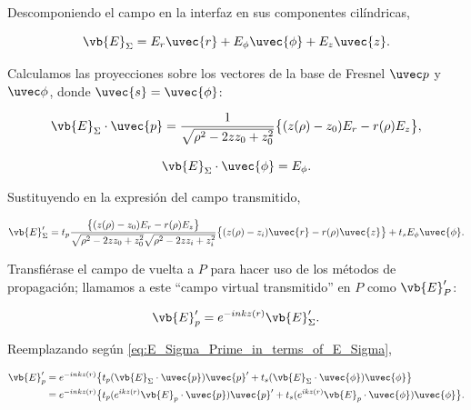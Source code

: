 Descomponiendo el campo en la interfaz en sus componentes cilíndricas,

\begin{equation}
    \vb{E}_{\Sigma}
    =
    E_r \uvec{r}
    +
    E_{\phi} \uvec{\phi}
    +
    E_z \uvec{z}.
\end{equation}

Calculamos las proyecciones sobre los vectores de la base de Fresnel $\uvec p$ y $\uvec \phi$, donde $\uvec{s}=\uvec{\phi}$:

\begin{equation}
    \vb{E}_{\Sigma} \cdot \uvec{p}
    =
    \frac{1}{\sqrt{\rho^2 - 2zz_0 + z_0^2}}
    \big\{
    (z(\rho) - z_0) E_r
    -
    r(\rho) E_z
    \big\},
\end{equation}

\begin{equation}
    \vb{E}_{\Sigma} \cdot \uvec{\phi}
    =
    E_{\phi}.
\end{equation}

Sustituyendo en la expresión del campo transmitido,

\begin{equation}
    \vb{E}'_{\Sigma}
    =
    t_p
    \frac{
    \big\{ (z(\rho) - z_0) E_r - r(\rho) E_z \big\}
    }
    {
    \sqrt{\rho^2 - 2zz_0 + z_0^2}
    \sqrt{\rho^2 - 2zz_i + z_i^2}
    }
    \big\{
    (z(\rho) - z_i) \uvec{r}
    -
    r(\rho) \uvec{z}
    \big\}
    +
    t_s E_{\phi} \uvec{\phi}.
\end{equation}

Transfiérase el campo de vuelta a $P$ para hacer uso de los métodos de propagación; llamamos a este ``campo virtual transmitido'' en $P$ como $\vb{E}_P'$:

\begin{equation}
    \vb{E}_p'
    =
    e^{-inkz(r)} \vb{E}_{\Sigma}'.
\end{equation}

Reemplazando según \eqref{eq:E_Sigma_Prime_in_terms_of_E_Sigma},

\begin{align}
    \vb{E}_p'
    &=
    e^{-inkz(r)}
    \big\{
    t_p (\vb{E}_{\Sigma} \cdot \uvec{p}) \uvec{p}'
    +
    t_s (\vb{E}_{\Sigma} \cdot \uvec{\phi}) \uvec{\phi}
    \big\}
    \nonumber
    \\
    &=
    e^{-inkz(r)}
    \big\{
    t_p (e^{ikz(r)} \vb{E}_p \cdot \uvec{p}) \uvec{p}'
    +
    t_s (e^{ikz(r)} \vb{E}_p \cdot \uvec{\phi}) \uvec{\phi}
    \big\}.
\end{align}

